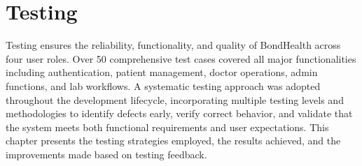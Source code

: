 \chapter{Testing}

\justifying
\noindent Testing ensures the reliability, functionality, and quality of BondHealth across four user roles. Over 50 comprehensive test cases covered all major functionalities including authentication, patient management, doctor operations, admin functions, and lab workflows. A systematic testing approach was adopted throughout the development lifecycle, incorporating multiple testing levels and methodologies to identify defects early, verify correct behavior, and validate that the system meets both functional requirements and user expectations. This chapter presents the testing strategies employed, the results achieved, and the improvements made based on testing feedback.

